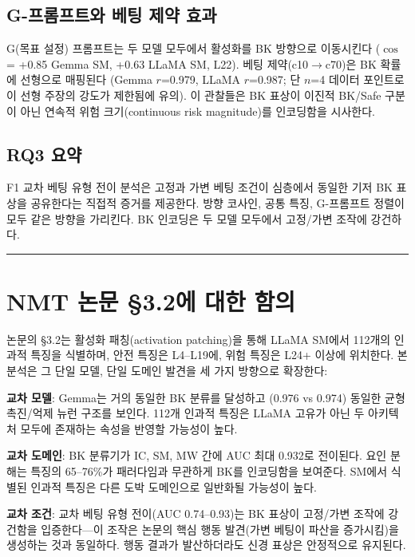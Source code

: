 \documentclass[11pt,a4paper]{article}
\begin{document}
\subsection{G-프롬프트와 베팅 제약 효과}

G(목표 설정) 프롬프트는 두 모델 모두에서 활성화를 BK 방향으로 이동시킨다 ($\cos$ = +0.85 Gemma SM, +0.63 LLaMA SM, L22). 베팅 제약(c10$\rightarrow$c70)은 BK 확률에 선형으로 매핑된다 (Gemma $r$=0.979, LLaMA $r$=0.987; 단 $n$=4 데이터 포인트로 이 선형 주장의 강도가 제한됨에 유의). 이 관찰들은 BK 표상이 이진적 BK/Safe 구분이 아닌 연속적 위험 크기(continuous risk magnitude)를 인코딩함을 시사한다.

\subsection{RQ3 요약}

F1 교차 베팅 유형 전이 분석은 고정과 가변 베팅 조건이 심층에서 동일한 기저 BK 표상을 공유한다는 직접적 증거를 제공한다. 방향 코사인, 공통 특징, G-프롬프트 정렬이 모두 같은 방향을 가리킨다. BK 인코딩은 두 모델 모두에서 고정/가변 조작에 강건하다.

\bigskip\hrule\bigskip

\section{NMT 논문 \S3.2에 대한 함의}

논문의 \S3.2는 활성화 패칭(activation patching)을 통해 LLaMA SM에서 112개의 인과적 특징을 식별하며, 안전 특징은 L4--L19에, 위험 특징은 L24+ 이상에 위치한다. 본 분석은 그 단일 모델, 단일 도메인 발견을 세 가지 방향으로 확장한다:

\textbf{교차 모델}: Gemma는 거의 동일한 BK 분류를 달성하고 (0.976 vs 0.974) 동일한 균형 촉진/억제 뉴런 구조를 보인다. 112개 인과적 특징은 LLaMA 고유가 아닌 두 아키텍처 모두에 존재하는 속성을 반영할 가능성이 높다.

\textbf{교차 도메인}: BK 분류기가 IC, SM, MW 간에 AUC 최대 0.932로 전이된다. 요인 분해는 특징의 65--76\%가 패러다임과 무관하게 BK를 인코딩함을 보여준다. SM에서 식별된 인과적 특징은 다른 도박 도메인으로 일반화될 가능성이 높다.

\textbf{교차 조건}: 교차 베팅 유형 전이(AUC 0.74--0.93)는 BK 표상이 고정/가변 조작에 강건함을 입증한다---이 조작은 논문의 핵심 행동 발견(가변 베팅이 파산을 증가시킴)을 생성하는 것과 동일하다. 행동 결과가 발산하더라도 신경 표상은 안정적으로 유지된다.
\end{document}
